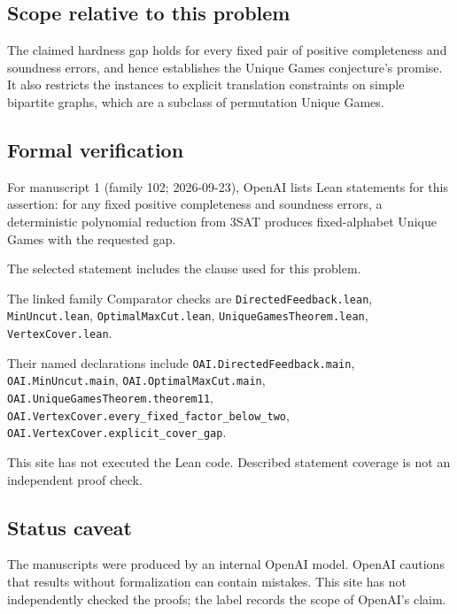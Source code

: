 \documentclass[11pt]{article}
\begin{document}
\subsection{Scope relative to this problem}
The claimed hardness gap holds for every fixed pair of positive completeness and soundness errors, and hence establishes the Unique Games conjecture's promise. It also restricts the instances to explicit translation constraints on simple bipartite graphs, which are a subclass of permutation Unique Games.

\subsection{Formal verification}
For manuscript 1 (family 102; 2026-09-23), OpenAI lists Lean statements for this assertion: for any fixed positive completeness and soundness errors, a deterministic polynomial reduction from 3SAT produces fixed-alphabet Unique Games with the requested gap.

The selected statement includes the clause used for this problem.

The linked family Comparator checks are \texttt{DirectedFeedback.lean}, \texttt{MinUncut.lean}, \texttt{OptimalMaxCut.lean}, \texttt{UniqueGamesTheorem.lean}, \texttt{VertexCover.lean}.

Their named declarations include \texttt{OAI.DirectedFeedback.main}, \texttt{OAI.MinUncut.main}, \texttt{OAI.OptimalMaxCut.main}, \texttt{OAI.UniqueGamesTheorem.theorem11}, \texttt{OAI.VertexCover.every\_fixed\_factor\_below\_two}, \texttt{OAI.VertexCover.explicit\_cover\_gap}.

This site has not executed the Lean code. Described statement coverage is not an independent proof check.

\subsection{Status caveat}
The manuscripts were produced by an internal OpenAI model. OpenAI cautions that results without formalization can contain mistakes. This site has not independently checked the proofs; the label records the scope of OpenAI's claim.
\end{document}
